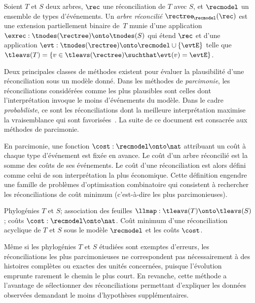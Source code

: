 \begin{definition}\label{definition:rectree}
    Soient \(T\) et \(S\) deux arbres, \(\rec\) une réconciliation de \(T\) avec \(S\), et \(\recmodel\) un ensemble de types d’événements.
    Un \emph{arbre réconcilié} \(\rectree_{\!\recmodel}(\rec)\) est une extension partiellement binaire de~\(T\) munie d’une application \(\exrec : \tnodes(\rectree) \onto \tnodes(S)\) qui étend \(\rec\) et d’une application \(\evt : \tnodes(\rectree) \onto \recmodel \cup \{\evtE\}\)
    telle que \(\tleavs(T) = \{ v \in \tleavs(\rectree) \suchthat \evt(v) = \evtE \}\).
\end{definition}

Deux principales classes de méthodes existent pour évaluer la plausibilité d’une réconciliation sous un modèle donné.
Dans les méthodes de \emph{parcimonie}, les réconciliations considérées comme les plus plausibles sont celles dont l’interprétation invoque le moins d’événements du modèle.
Dans le cadre \emph{probabiliste}, ce sont les réconciliations dont la meilleure interprétation maximise la vraisemblance qui sont favorisées~\parencite{Doyon2011ModelsAlgorithmsPrograms}.
La suite de ce document est consacrée aux méthodes de parcimonie.

En parcimonie, une fonction \(\cost : \recmodel \onto \nat\) attribuant un coût à chaque type d’événement est fixée en avance.
Le coût d’un arbre réconcilié est la somme des coûts de ses événements.
Le coût d’une réconciliation est alors défini comme celui de son interprétation la plus économique.
Cette définition engendre une famille de problèmes d’optimisation combinatoire qui consistent à rechercher les réconciliations de coût minimum (c’est-à-dire les plus parcimonieuses).

    {Phylogénies \(T\) et \(S\);
     association des feuilles \(\llmap : \tleavs(T) \onto \tleavs(S)\);
     coûts \(\cost : \recmodel \onto \nat\).}
    {Coût minimum d’une réconciliation acyclique de \(T\) et \(S\)
     sous le modèle \(\recmodel\) et les coûts \(\cost\).}

Même si les phylogénies \(T\) et \(S\) étudiées sont exemptes d’erreurs, les réconciliations les plus parcimonieuses ne correspondent pas nécessairement à des histoires complètes ou exactes des unités concernées, puisque l’évolution emprunte rarement le chemin le plus court.
En revanche, cette méthode a l’avantage de sélectionner des réconciliations permettant d’expliquer les données observées demandant le moins d’hypothèses supplémentaires.

